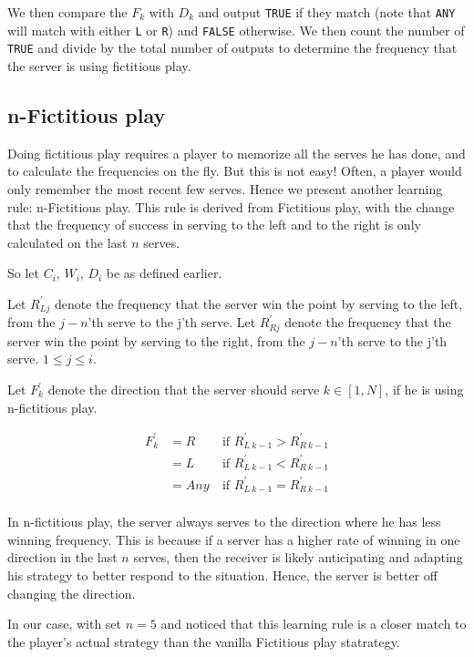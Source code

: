 \documentclass[11pt]{article}
\begin{document}
We then compare the $F_k$ with $D_k$ and output \texttt{TRUE} if they match (note that \texttt{ANY} will match with either \texttt{L} or \texttt{R}) and \texttt{FALSE} otherwise. We then count the number of \texttt{TRUE} and divide by the total number of outputs to determine the frequency that the server is using fictitious play.

\subsection{n-Fictitious play}

Doing fictitious play requires a player to memorize all the serves he has done, and to calculate the frequencies on the fly. But this is not easy! Often, a player would only remember the most recent few serves. Hence we present another learning rule: n-Fictitious play. This rule is derived from Fictitious play, with the change that the frequency of success in serving to the left and to the right is only calculated on the last $n$ serves. 

So let $C_i$, $W_i$, $D_i$ be as defined earlier. 

Let $R^\prime_{Lj}$ denote the frequency that the server win the point by serving to the left, from the $j-n$'th serve to the j'th serve. Let $R^\prime_{Rj}$ denote the frequency that the server win the point by serving to the right, from the $j-n$'th serve to the j'th serve. $1 \leq j \leq i$. 

Let $F^\prime_k$ denote the direction that the server should serve $k\in [1, N]$, if he is using n-fictitious play.

\[
\begin{aligned}
F^\prime_k & = R & ~\mbox{if $R^\prime_{L~k-1} > R^\prime_{R~k-1}$} \\
    & = L & ~\mbox{if $R^\prime_{L~k-1} < R^\prime_{R~k-1}$} \\
    & = Any & ~\mbox{if $R^\prime_{L~k-1} = R^\prime_{R~k-1}$} \\
\end{aligned}
\]

In n-fictitious play, the server always serves to the direction where he has less winning frequency. This is because if a server has a higher rate of winning in one direction in the last $n$ serves, then the receiver is likely anticipating and adapting his strategy to better respond to the situation. Hence, the server is better off changing the direction.

In our case, with set $n = 5$ and noticed that this learning rule is a closer match to the player's actual strategy than the vanilla Fictitious play statrategy.
\end{document}

